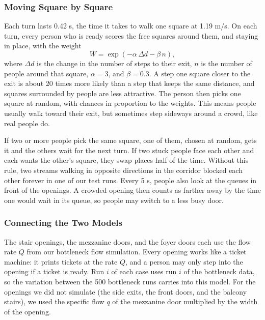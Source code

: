 \subsubsection{Moving Square by Square}
Each turn lasts 0.42 s, the time it takes to walk one square at 1.19 m/s. On each turn, every person who is ready scores the free squares around them, and staying in place, with the weight
\begin{equation}
    W = \exp\left(-\alpha \, \Delta d - \beta \, n\right),
\end{equation}
where $\Delta d$ is the change in the number of steps to their exit, $n$ is the number of people around that square, $\alpha = 3$, and $\beta = 0.3$. A step one square closer to the exit is about 20 times more likely than a step that keeps the same distance, and squares surrounded by people are less attractive. The person then picks one square at random, with chances in proportion to the weights. This means people usually walk toward their exit, but sometimes step sideways around a crowd, like real people do.

If two or more people pick the same square, one of them, chosen at random, gets it and the others wait for the next turn. If two stuck people face each other and each wants the other's square, they swap places half of the time. Without this rule, two streams walking in opposite directions in the corridor blocked each other forever in one of our test runs. Every 5 s, people also look at the queues in front of the openings. A crowded opening then counts as farther away by the time one would wait in its queue, so people may switch to a less busy door.

\subsubsection{Connecting the Two Models}
The stair openings, the mezzanine doors, and the foyer doors each use the flow rate $Q$ from our bottleneck flow simulation. Every opening works like a ticket machine: it prints tickets at the rate $Q$, and a person may only step into the opening if a ticket is ready. Run $i$ of each case uses run $i$ of the bottleneck data, so the variation between the 500 bottleneck runs carries into this model. For the openings we did not simulate (the side exits, the front doors, and the balcony stairs), we used the specific flow $q$ of the mezzanine door multiplied by the width of the opening.

